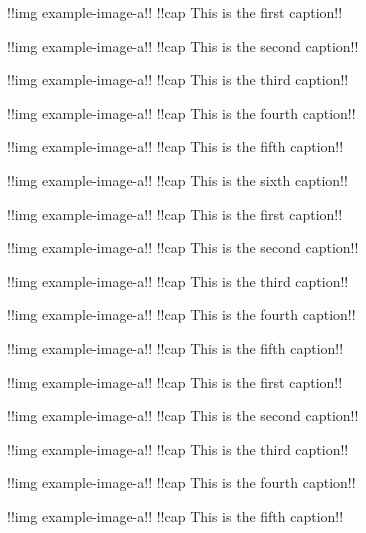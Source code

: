 \documentclass{scrbook}
\begin{document}
\begin{multiimages}[env=figure,pos=ht]
  !!img example-image-a!!
  !!cap This is the first caption!!

  !!img example-image-a!!
  !!cap This is the second caption!!

  !!img example-image-a!!
  !!cap This is the third caption!!

  !!img example-image-a!!
  !!cap This is the fourth caption!!

  !!img example-image-a!!
  !!cap This is the fifth caption!!

  !!img example-image-a!!
  !!cap This is the sixth caption!!
\end{multiimages}

\begin{multiimages}[last=center]
  !!img example-image-a!!
  !!cap This is the first caption!!

  !!img example-image-a!!
  !!cap This is the second caption!!

  !!img example-image-a!!
  !!cap This is the third caption!!

  !!img example-image-a!!
  !!cap This is the fourth caption!!

  !!img example-image-a!!
  !!cap This is the fifth caption!!

\end{multiimages}

\begin{multiimages}[last=center,env=figure,pos=p,inner=3cm,skip=10ex]
  !!img example-image-a!!
  !!cap This is the first caption!!

  !!img example-image-a!!
  !!cap This is the second caption!!

  !!img example-image-a!!
  !!cap This is the third caption!!

  !!img example-image-a!!
  !!cap This is the fourth caption!!

  !!img example-image-a!!
  !!cap This is the fifth caption!!

\end{multiimages}
\end{document}
